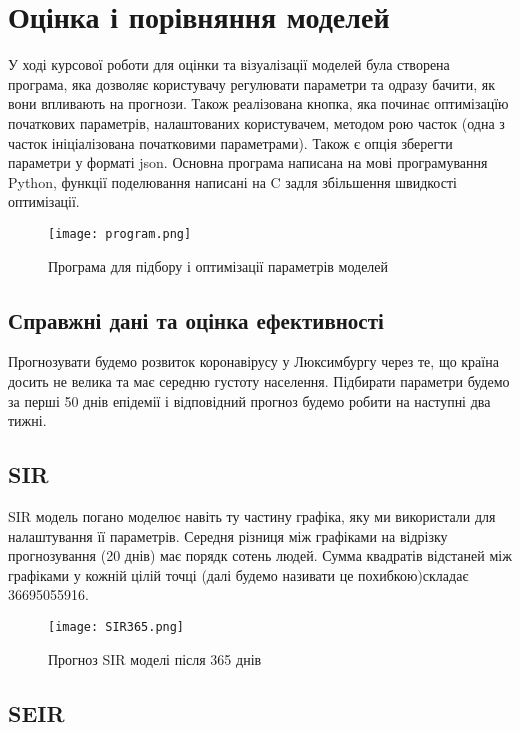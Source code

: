 \chapter{Оцінка і порівняння моделей}


У ході курсової роботи для оцінки та візуалізації моделей була створена 
програма, яка дозволяє користувачу регулювати параметри та одразу бачити, 
як вони впливають на прогнози. Також реалізована кнопка, яка починає 
оптимізацїю початкових параметрів, налаштованих користувачем, методом рою 
часток (одна з часток ініціалізована початковими параметрами). Також 
є опція зберегти параметри у форматі json. 
Основна програма написана на мові програмування Python, функції поделювання 
написані на C задля збільшення швидкості оптимізації.

\begin{figure}[H]
    \centering
    \texttt{[image: program.png]}
    \caption{Програма для підбору і оптимізації параметрів моделей}
    \label{fig:plot0}
\end{figure}


\section{Справжні дані та оцінка ефективності}

Прогнозувати будемо розвиток коронавірусу у Люксимбургу через те, що країна 
досить не велика та має середню густоту населення. 
Підбирати параметри будемо за перші 50 днів епідемії і відповідний прогноз 
будемо робити на наступні два тижні. 

\section{SIR}


SIR модель погано моделює навіть ту частину графіка, яку ми використали для 
налаштування її параметрів. Середня різниця між графіками на відрізку 
прогнозування (20 днів) має порядк сотень людей. 
Сумма квадратів відстаней між графіками у кожній цілій точці  
(далі будемо називати це похибкою)складає 36695055916.


\begin{figure}[H]
    \centering
    \texttt{[image: SIR365.png]}
    \caption{Прогноз SIR моделі після 365 днів}
    \label{fig:plot1}
\end{figure}


\section{SEIR}


